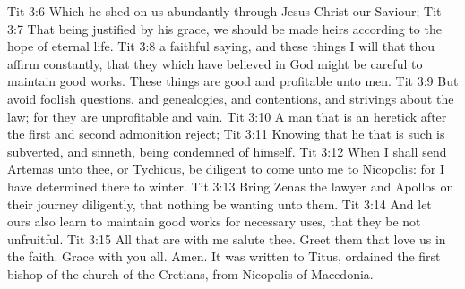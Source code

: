 \vs Tit 3:6 Which he shed on us abundantly through Jesus Christ our Saviour;
\vs Tit 3:7 That being justified by his grace, we should be made heirs according to the hope of eternal life.
\vs Tit 3:8  a faithful saying, and these things I will that thou affirm constantly, that they which have believed in God might be careful to maintain good works. These things are good and profitable unto men.
\vs Tit 3:9 But avoid foolish questions, and genealogies, and contentions, and strivings about the law; for they are unprofitable and vain.
\vs Tit 3:10 A man that is an heretick after the first and second admonition reject;
\vs Tit 3:11 Knowing that he that is such is subverted, and sinneth, being condemned of himself.
\vs Tit 3:12 When I shall send Artemas unto thee, or Tychicus, be diligent to come unto me to Nicopolis: for I have determined there to winter.
\vs Tit 3:13 Bring Zenas the lawyer and Apollos on their journey diligently, that nothing be wanting unto them.
\enlargethispage*{\baselineskip}
\vs Tit 3:14 And let ours also learn to maintain good works for necessary uses, that they be not unfruitful.
\vs Tit 3:15 All that are with me salute thee. Greet them that love us in the faith. Grace  with you all. Amen. It was written to Titus, ordained the first bishop of the church of the Cretians, from Nicopolis of Macedonia.
